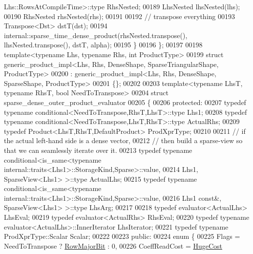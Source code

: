 \begin{DoxyCode}
       Lhs::RowsAtCompileTime>::type RhsNested;
00189     LhsNested lhsNested(lhs);
00190     RhsNested rhsNested(rhs);
00191     
00192     \textcolor{comment}{// transpose everything}
00193     Transpose<Dst> dstT(dst);
00194     internal::sparse\_time\_dense\_product(rhsNested.transpose(), lhsNested.transpose(), dstT, alpha);
00195   \}
00196 \};
00197 
00198 \textcolor{keyword}{template}<\textcolor{keyword}{typename} Lhs, \textcolor{keyword}{typename} Rhs, \textcolor{keywordtype}{int} ProductType>
00199 \textcolor{keyword}{struct }generic\_product\_impl<Lhs, Rhs, DenseShape, SparseTriangularShape, ProductType>
00200   : generic\_product\_impl<Lhs, Rhs, DenseShape, SparseShape, ProductType>
00201 \{\};
00202 
00203 \textcolor{keyword}{template}<\textcolor{keyword}{typename} LhsT, \textcolor{keyword}{typename} RhsT, \textcolor{keywordtype}{bool} NeedToTranspose>
00204 \textcolor{keyword}{struct }sparse\_dense\_outer\_product\_evaluator
00205 \{
00206 \textcolor{keyword}{protected}:
00207   \textcolor{keyword}{typedef} \textcolor{keyword}{typename} conditional<NeedToTranspose,RhsT,LhsT>::type Lhs1;
00208   \textcolor{keyword}{typedef} \textcolor{keyword}{typename} conditional<NeedToTranspose,LhsT,RhsT>::type ActualRhs;
00209   \textcolor{keyword}{typedef} Product<LhsT,RhsT,DefaultProduct> ProdXprType;
00210   
00211   \textcolor{comment}{// if the actual left-hand side is a dense vector,}
00212   \textcolor{comment}{// then build a sparse-view so that we can seamlessly iterate over it.}
00213   \textcolor{keyword}{typedef} \textcolor{keyword}{typename} conditional<is\_same<typename internal::traits<Lhs1>::StorageKind,Sparse>::value,
00214             Lhs1, SparseView<Lhs1> >::type ActualLhs;
00215   \textcolor{keyword}{typedef} \textcolor{keyword}{typename} conditional<is\_same<typename internal::traits<Lhs1>::StorageKind,Sparse>::value,
00216             Lhs1 \textcolor{keyword}{const}&, SparseView<Lhs1> >::type LhsArg;
00217             
00218   \textcolor{keyword}{typedef} evaluator<ActualLhs> LhsEval;
00219   \textcolor{keyword}{typedef} evaluator<ActualRhs> RhsEval;
00220   \textcolor{keyword}{typedef} \textcolor{keyword}{typename} evaluator<ActualLhs>::InnerIterator LhsIterator;
00221   \textcolor{keyword}{typedef} \textcolor{keyword}{typename} ProdXprType::Scalar Scalar;
00222   
00223 \textcolor{keyword}{public}:
00224   \textcolor{keyword}{enum} \{
00225     Flags = NeedToTranspose ? \hyperlink{group__flags_gae4f56c2a60bbe4bd2e44c5b19cbe8762}{RowMajorBit} : 0,
00226     CoeffReadCost = \hyperlink{namespace_eigen_a3163430a1c13173faffde69016b48aaf}{HugeCost}

\end{DoxyCode}
